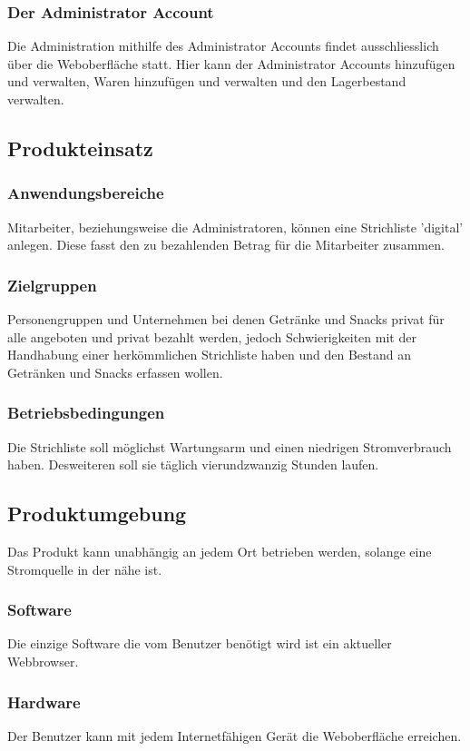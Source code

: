 \documentclass[11pt,a4paper]{article} %
\begin{document}
\subsubsection{Der Administrator Account}
Die Administration mithilfe des Administrator Accounts findet ausschliesslich über die Weboberfläche statt. Hier kann der Administrator Accounts hinzufügen und verwalten, Waren hinzuf\"ugen und verwalten und den Lagerbestand verwalten.

\subsection{Produkteinsatz}
\subsubsection{Anwendungsbereiche}
Mitarbeiter, beziehungsweise die Administratoren, können eine Strichliste 'digital' anlegen. Diese fasst den zu bezahlenden Betrag für die Mitarbeiter zusammen.

\subsubsection{Zielgruppen}
Personengruppen und Unternehmen bei denen Getränke und Snacks privat für alle angeboten und privat bezahlt werden, jedoch Schwierigkeiten mit der Handhabung einer herk\"ommlichen Strichliste haben und den Bestand an Getränken und Snacks erfassen wollen.

\subsubsection{Betriebsbedingungen}
Die Strichliste soll möglichst Wartungsarm und einen niedrigen Stromverbrauch haben. Desweiteren soll sie täglich vierundzwanzig Stunden laufen.

\subsection{Produktumgebung}
Das Produkt kann unabhängig an jedem Ort betrieben werden, solange eine Stromquelle in der nähe ist.

\subsubsection{Software}
Die einzige Software die vom Benutzer benötigt wird ist ein aktueller Webbrowser.

\subsubsection{Hardware}
Der Benutzer kann mit jedem Internetfähigen Gerät die Weboberfläche erreichen.
\end{document}
